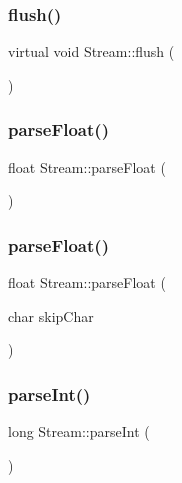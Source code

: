 \mbox{\label{class_stream_aa3ef2c34f152a0b2ea8de9139b9461da}} 
\subsubsection{\texorpdfstring{flush()}{flush()}}
{\footnotesize\ttfamily virtual void Stream\+::flush (\begin{DoxyParamCaption}{ }\end{DoxyParamCaption})\hspace{0.3cm}{\ttfamily [pure virtual]}}

\mbox{\label{class_stream_a5e5a0cc11eb586d89dcb7fa8e53a87e8}} 
\subsubsection{\texorpdfstring{parse\+Float()}{parseFloat()}\hspace{0.1cm}{\footnotesize\ttfamily [1/2]}}
{\footnotesize\ttfamily float Stream\+::parse\+Float (\begin{DoxyParamCaption}{ }\end{DoxyParamCaption})}

\mbox{\label{class_stream_a14a98cdbb166008f25dd044d836b1864}} 
\subsubsection{\texorpdfstring{parse\+Float()}{parseFloat()}\hspace{0.1cm}{\footnotesize\ttfamily [2/2]}}
{\footnotesize\ttfamily float Stream\+::parse\+Float (\begin{DoxyParamCaption}\item[{char}]{skip\+Char }\end{DoxyParamCaption})\hspace{0.3cm}{\ttfamily [protected]}}

\mbox{\label{class_stream_a497ffcbcb4d5bb889a8fde487bcc1b98}} 
\subsubsection{\texorpdfstring{parse\+Int()}{parseInt()}\hspace{0.1cm}{\footnotesize\ttfamily [1/2]}}
{\footnotesize\ttfamily long Stream\+::parse\+Int (\begin{DoxyParamCaption}{ }\end{DoxyParamCaption})}

